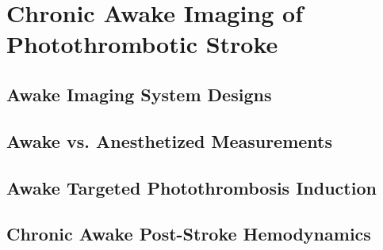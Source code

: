 
\chapter{Chronic Awake Imaging of Photothrombotic Stroke} \label{ch:awake}

\blindtext



\section{Awake Imaging System Designs}

\blindtext



\section{Awake vs. Anesthetized Measurements}

\blindtext



\section{Awake Targeted Photothrombosis Induction}

\blindtext



\section{Chronic Awake Post-Stroke Hemodynamics}

